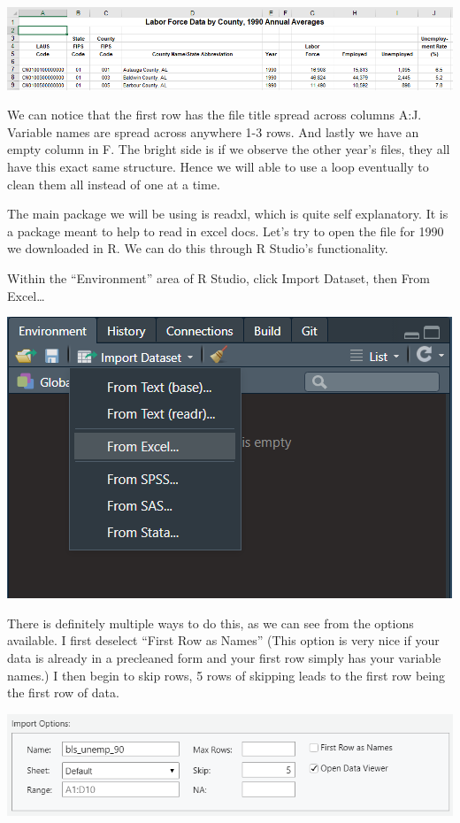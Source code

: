 \documentclass[
]{book}
\begin{document}
\begin{center}\includegraphics[width=0.8\linewidth]{img/data_head} \end{center}

We can notice that the first row has the file title spread across columns A:J. Variable names are spread across anywhere 1-3 rows. And lastly we have an empty column in F. The bright side is if we observe the other year's files, they all have this exact same structure. Hence we will able to use a loop eventually to clean them all instead of one at a time.

The main package we will be using is readxl, which is quite self explanatory. It is a package meant to help to read in excel docs. Let's try to open the file for 1990 we downloaded in R. We can do this through R Studio's functionality.

Within the ``Environment'' area of R Studio, click Import Dataset, then From Excel\ldots{}

\begin{center}\includegraphics[width=0.4\linewidth]{img/import_fromexcel} \end{center}

There is definitely multiple ways to do this, as we can see from the options available. I first deselect ``First Row as Names'' (This option is very nice if your data is already in a precleaned form and your first row simply has your variable names.) I then begin to skip rows, 5 rows of skipping leads to the first row being the first row of data.

\begin{center}\includegraphics[width=0.7\linewidth]{img/import_fromexceloptions} \end{center}
\end{document}
